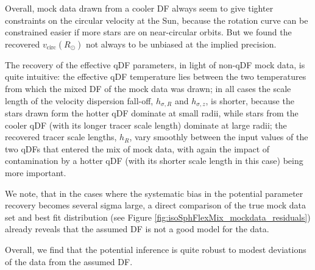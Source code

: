 Overall, mock data drawn from a cooler DF always seem to give tighter constraints on the circular velocity at the Sun, because the rotation curve can be constrained easier if more stars are on near-circular orbits. But we found the recovered $v_\text{circ}(R_\odot)$ not always to be unbiased at the implied precision.

The recovery of the effective qDF parameters, in light of non-qDF mock data, is quite intuitive: the effective qDF temperature lies between the two temperatures from which the mixed DF of the mock data was drawn; in all cases the scale length of the velocity dispersion fall-off, $h_{\sigma,R}$ and $h_{\sigma,z}$, is shorter, because the stars drawn form the hotter qDF dominate at small radii, while stars from the cooler qDF (with its longer tracer scale length) dominate at large radii; the recovered tracer scale lengths, $h_R$, vary smoothly between the input values of the two qDFs that entered the mix of mock data, with again the impact of contamination by a hotter qDF (with its shorter scale length in this case) being more important. 

We note, that in the cases where the systematic bias in the potential parameter recovery becomes several sigma large, a direct comparison of the true mock data set and best fit distribution (see Figure \ref{fig:isoSphFlexMix_mockdata_residuals}) already reveals that the assumed DF is not a good model for the data.

Overall, we find that the potential inference is quite robust to modest deviations of the data from the assumed DF. 




